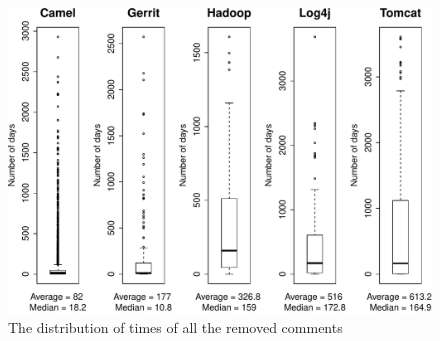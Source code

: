 


\begin{figure}[t]
	\centering
	\includegraphics[width=\columnwidth]{figures/test/distribution_.pdf}
	\caption{The distribution of times of all the removed \SATD comments}
	\label{fig:removed_all_std_comments}
\end{figure}




